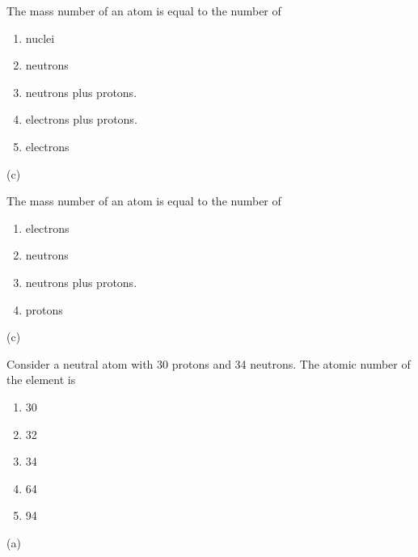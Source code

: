 \documentclass[main.tex]{subfiles}
\begin{document}
\begin{multicols*}{2}
\begin{question}[ID=12]
The mass number of an atom is equal to the number of  
  \noindent
  \begin{enumerate} [topsep=0pt, partopsep=1pt, label=(\alph*), leftmargin=1cm]
\item nuclei
\item neutrons
\item neutrons plus protons.
\item electrons plus protons.
\item electrons
\end{enumerate}
\end{question}
\begin{solution}
(c)
\hspace{0.1cm}\end{solution}




\begin{question}[ID=13]
The mass number of an atom is equal to the number of  
  \noindent
  \begin{enumerate} [topsep=0pt, partopsep=1pt, label=(\alph*), leftmargin=1cm]
\item electrons
\item neutrons
\item neutrons plus protons.
\item  protons
\end{enumerate}
\end{question}
\begin{solution}
(c)
\hspace{0.1cm}\end{solution}




\begin{question}[ID=14]
Consider a neutral atom with 30 protons and 34 neutrons. The atomic number of the element is
\begin{multicols}{1}
  \noindent
  \begin{enumerate} [topsep=0pt, partopsep=1pt, label=(\alph*), leftmargin=1cm]
\item 30
\item 32
\item 34
\item  64
\item 94
\end{enumerate}
\end{multicols}    
\end{question}
\begin{solution}
(a)
\hspace{0.1cm}\end{solution}





\end{multicols*}
\end{document}
